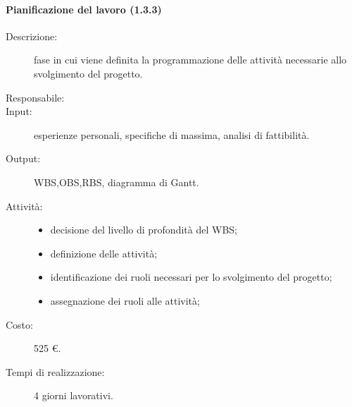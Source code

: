\paragraph{Pianificazione del lavoro (1.3.3)}
\begin{description}
\item[Descrizione:] fase in cui viene definita la programmazione delle attività necessarie allo svolgimento del progetto.
\item[Responsabile:] 
\item[Input:] esperienze personali, specifiche di massima, analisi di fattibilità.
\item[Output:] WBS,OBS,RBS, diagramma di Gantt.
\item[Attività:] 
\begin{center}
\begin{itemize}
\item decisione del livello di profondità del WBS;
\item definizione delle attività;
\item identificazione dei ruoli necessari per lo svolgimento del progetto;
\item assegnazione dei ruoli alle attività;
\end{itemize}
\end{center}
\item[Costo:] 525 \euro{}.
\item[Tempi di realizzazione:] 4 giorni lavorativi.
\end{description}

